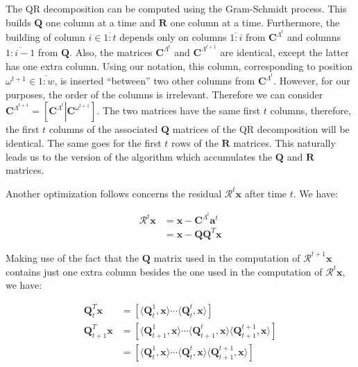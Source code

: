 \documentclass[12pt,a4paper,oneside,english]{UPBThesis}
\newcommand{\hcrange}[2]{\overline{{#1}\colon\!\!{#2}}}
\begin{document}
The QR decomposition can be computed using the Gram-Schmidt process. This builds $\textbf{Q}$ one column at a time and $\textbf{R}$ one column at a time. Furthermore, the building of column $i \in \hcrange{1}{t}$ depends only on columns $\hcrange{1}{i}$ from $\textbf{C}^{\Lambda^t}$ and columns $\hcrange{1}{i-1}$ from $\textbf{Q}$. Also, the matrices $\textbf{C}^{\Lambda^t}$ and $\textbf{C}^{\Lambda^{t+1}}$ are identical, except the latter has one extra column. Using our notation, this column, corresponding to position $\omega^{t+1} \in \hcrange{1}{w}$, is inserted ``between'' two other columns from $\textbf{C}^{\Lambda^t}$. However, for our purposes, the order of the columns is irrelevant. Therefore we can consider $\textbf{C}^{\Lambda^{t+1}} = \left[\textbf{C}^{\Lambda^t} \left|\right. \textbf{C}^{\omega^{t+1}} \right]$. The two matrices have the same first $t$ columns, therefore, the first $t$ columns of the associated $\textbf{Q}$ matrices of the QR decomposition will be identical. The same goes for the first $t$ rows of the $\textbf{R}$ matrices. This naturally leads us to the version of the algorithm which accumulates the $\textbf{Q}$ and $\textbf{R}$ matrices.

Another optimization follows concerns the residual $\mathcal{R}^t\textbf{x}$ after time $t$. We have:

\begin{align*}
\mathcal{R}^t\textbf{x} & = \textbf{x} - \textbf{C}^{\Lambda^t}\textbf{a}^t \\
& = \textbf{x} - \textbf{Q}\textbf{Q}^T\textbf{x}
\end{align*}

Making use of the fact that the $\textbf{Q}$ matrix used in the computation of $\mathcal{R}^{t+1}\textbf{x}$ contains just one extra column besides the one used in the computation of $\mathcal{R}^t\textbf{x}$, we have:

\begin{align*}
\textbf{Q}_t^T\textbf{x} & = [ \langle \textbf{Q}_t^1, \textbf{x} \rangle \cdots \langle \textbf{Q}_t^t, \textbf{x} \rangle ] \\
\textbf{Q}_{t+1}^T\textbf{x} & = [ \langle \textbf{Q}_{t+1}^1, \textbf{x} \rangle \cdots \langle \textbf{Q}_{t+1}^t, \textbf{x} \rangle \langle \textbf{Q}_{t+1}^{t+1}, \textbf{x} \rangle ] \\
& = [ \langle \textbf{Q}_t^1, \textbf{x} \rangle \cdots \langle \textbf{Q}_t^t, \textbf{x} \rangle \langle \textbf{Q}_{t+1}^{t+1}, \textbf{x} \rangle] \\
\end{align*}
\end{document}

